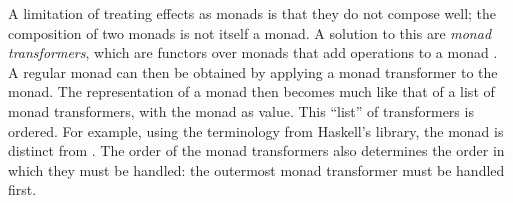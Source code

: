 



A limitation of treating effects as monads is that they do not compose well; the composition of two monads is not itself a monad. A solution to this are \emph{monad transformers}, which are functors over monads that add operations to a monad \autocite{moggi_abstract_1989}. A regular monad can then be obtained by applying a monad transformer to the  monad. The representation of a monad then becomes much like that of a list of monad transformers, with the  monad as  value. This ``list'' of transformers is ordered. For example, using the terminology from Haskell's  library, the monad  is distinct from . The order of the monad transformers also determines the order in which they must be handled: the outermost monad transformer must be handled first.

